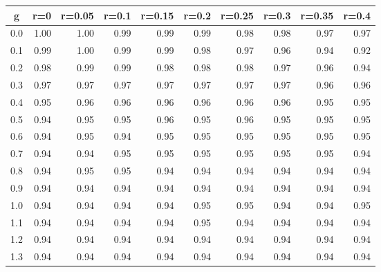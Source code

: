 %
\begin{table}[!tbp]
 \begin{center}
 \begin{tabular}{rrrrrrrrrr}\hline\hline
\multicolumn{1}{c}{g}&\multicolumn{1}{c}{r=0}&\multicolumn{1}{c}{r=0.05}&\multicolumn{1}{c}{r=0.1}&\multicolumn{1}{c}{r=0.15}&\multicolumn{1}{c}{r=0.2}&\multicolumn{1}{c}{r=0.25}&\multicolumn{1}{c}{r=0.3}&\multicolumn{1}{c}{r=0.35}&\multicolumn{1}{c}{r=0.4}\tabularnewline
\hline
0.0&1.00&1.00&0.99&0.99&0.99&0.98&0.98&0.97&0.97\tabularnewline
0.1&0.99&1.00&0.99&0.99&0.98&0.97&0.96&0.94&0.92\tabularnewline
0.2&0.98&0.99&0.99&0.98&0.98&0.98&0.97&0.96&0.94\tabularnewline
0.3&0.97&0.97&0.97&0.97&0.97&0.97&0.97&0.96&0.96\tabularnewline
0.4&0.95&0.96&0.96&0.96&0.96&0.96&0.96&0.95&0.95\tabularnewline
0.5&0.94&0.95&0.95&0.96&0.95&0.96&0.95&0.95&0.95\tabularnewline
0.6&0.94&0.95&0.94&0.95&0.95&0.95&0.95&0.95&0.95\tabularnewline
0.7&0.94&0.94&0.95&0.95&0.95&0.95&0.95&0.95&0.94\tabularnewline
0.8&0.94&0.95&0.95&0.94&0.94&0.94&0.94&0.94&0.94\tabularnewline
0.9&0.94&0.94&0.94&0.94&0.94&0.94&0.94&0.94&0.94\tabularnewline
1.0&0.94&0.94&0.94&0.94&0.95&0.95&0.94&0.94&0.95\tabularnewline
1.1&0.94&0.94&0.94&0.94&0.95&0.94&0.94&0.94&0.94\tabularnewline
1.2&0.94&0.94&0.94&0.94&0.94&0.94&0.94&0.94&0.94\tabularnewline
1.3&0.94&0.94&0.94&0.94&0.94&0.94&0.94&0.94&0.94\tabularnewline
\hline
\end{tabular}

\end{center}

\end{table}

